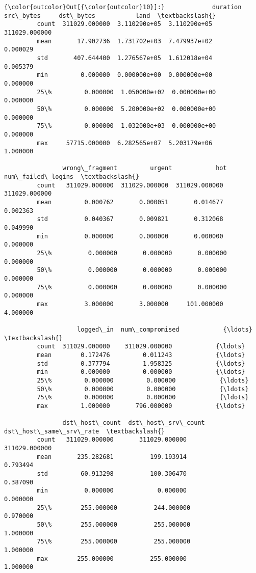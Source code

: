 \documentclass[11pt]{article}
\begin{document}
\begin{Verbatim}[commandchars=\\\{\}]
{\color{outcolor}Out[{\color{outcolor}10}]:}             duration     src\_bytes     dst\_bytes           land  \textbackslash{}
         count  311029.000000  3.110290e+05  3.110290e+05  311029.000000   
         mean       17.902736  1.731702e+03  7.479937e+02       0.000029   
         std       407.644400  1.276567e+05  1.612018e+04       0.005379   
         min         0.000000  0.000000e+00  0.000000e+00       0.000000   
         25\%         0.000000  1.050000e+02  0.000000e+00       0.000000   
         50\%         0.000000  5.200000e+02  0.000000e+00       0.000000   
         75\%         0.000000  1.032000e+03  0.000000e+00       0.000000   
         max     57715.000000  6.282565e+07  5.203179e+06       1.000000   
         
                wrong\_fragment         urgent            hot  num\_failed\_logins  \textbackslash{}
         count   311029.000000  311029.000000  311029.000000      311029.000000   
         mean         0.000762       0.000051       0.014677           0.002363   
         std          0.040367       0.009821       0.312068           0.049990   
         min          0.000000       0.000000       0.000000           0.000000   
         25\%          0.000000       0.000000       0.000000           0.000000   
         50\%          0.000000       0.000000       0.000000           0.000000   
         75\%          0.000000       0.000000       0.000000           0.000000   
         max          3.000000       3.000000     101.000000           4.000000   
         
                    logged\_in  num\_compromised            {\ldots}             \textbackslash{}
         count  311029.000000    311029.000000            {\ldots}              
         mean        0.172476         0.011243            {\ldots}              
         std         0.377794         1.958325            {\ldots}              
         min         0.000000         0.000000            {\ldots}              
         25\%         0.000000         0.000000            {\ldots}              
         50\%         0.000000         0.000000            {\ldots}              
         75\%         0.000000         0.000000            {\ldots}              
         max         1.000000       796.000000            {\ldots}              
         
                dst\_host\_count  dst\_host\_srv\_count  dst\_host\_same\_srv\_rate  \textbackslash{}
         count   311029.000000       311029.000000           311029.000000   
         mean       235.282681          199.193914                0.793494   
         std         60.913298          100.306470                0.387090   
         min          0.000000            0.000000                0.000000   
         25\%        255.000000          244.000000                0.970000   
         50\%        255.000000          255.000000                1.000000   
         75\%        255.000000          255.000000                1.000000   
         max        255.000000          255.000000                1.000000   
         

\end{Verbatim}
\end{document}
